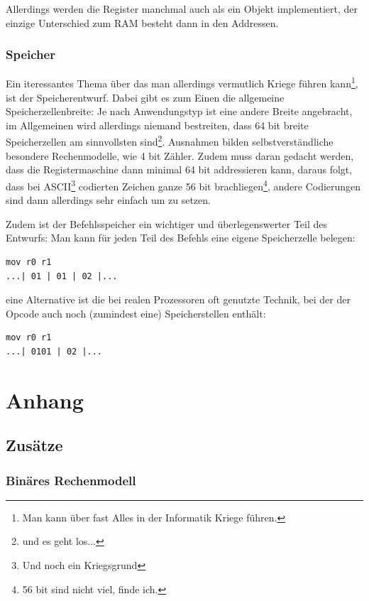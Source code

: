 \documentclass[a4paper,12pt,oneside]{scrreprt}
\begin{document}
Allerdings werden die Register manchmal auch als ein Objekt implementiert, der einzige Unterschied zum RAM besteht dann in den Addressen.

\section{Speicher}

Ein iteressantes Thema über das man allerdings vermutlich Kriege führen kann\footnote{ Man kann über fast Alles in der Informatik Kriege führen.}, ist der Speicherentwurf. Dabei gibt es zum Einen die allgemeine Speicherzellenbreite: Je nach Anwendungstyp ist eine andere Breite angebracht, im Allgemeinen wird allerdings niemand bestreiten, dass 64 bit breite Speicherzellen am sinnvollsten sind\footnote{und es geht los...}. 
Ausnahmen bilden selbstverständliche besondere Rechenmodelle, wie 4 bit Zähler. Zudem muss daran gedacht werden, dass die Registermaschine dann minimal 64 bit addressieren kann, daraus folgt, dass bei ASCII\footnote{Und noch ein Kriegsgrund} codierten Zeichen ganze 56 bit brachliegen\footnote{56 bit sind nicht viel, finde ich.}, andere Codierungen sind dann allerdings sehr einfach um zu setzen.

Zudem ist der Befehlsspeicher ein wichtiger und überlegenswerter Teil des Entwurfs:
Man kann für jeden Teil des Befehls eine eigene Speicherzelle belegen:
\begin{lstlisting}[frame=single]
mov r0 r1
...| 01 | 01 | 02 |...
\end{lstlisting}

eine Alternative ist die bei realen Prozessoren oft genutzte Technik, bei der der Opcode auch noch (zumindest eine) Speicherstellen enthält:

\begin{lstlisting}[frame=single]
mov r0 r1
...| 0101 | 02 |...
\end{lstlisting}

\part{Anhang}

\chapter{Zusätze}
\section{Binäres Rechenmodell}
\label{sec:calc_model}
\end{document}
